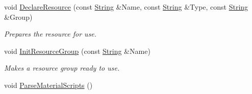 \begin{DoxyCompactItemize}
void \hyperlink{classphys_1_1ResourceManager_a6ac7835a02dff32e60a73320f9c9dabb}{DeclareResource} (const \hyperlink{namespacephys_aa03900411993de7fbfec4789bc1d392e}{String} \&Name, const \hyperlink{namespacephys_aa03900411993de7fbfec4789bc1d392e}{String} \&Type, const \hyperlink{namespacephys_aa03900411993de7fbfec4789bc1d392e}{String} \&Group)
\begin{DoxyCompactList}\small\item\em Prepares the resource for use. \item\end{DoxyCompactList}\item 
void \hyperlink{classphys_1_1ResourceManager_aa2f44129dfc3dc0b0ee332a2bba6078d}{InitResourceGroup} (const \hyperlink{namespacephys_aa03900411993de7fbfec4789bc1d392e}{String} \&Name)
\begin{DoxyCompactList}\small\item\em Makes a resource group ready to use. \item\end{DoxyCompactList}\item 
\hypertarget{classphys_1_1ResourceManager_a348f333ffd9638decd144bf9d65ca05d}{
void \hyperlink{classphys_1_1ResourceManager_a348f333ffd9638decd144bf9d65ca05d}{ParseMaterialScripts} ()}
\label{d1/d35/classphys_1_1ResourceManager_a348f333ffd9638decd144bf9d65ca05d}


\end{DoxyCompactItemize}
